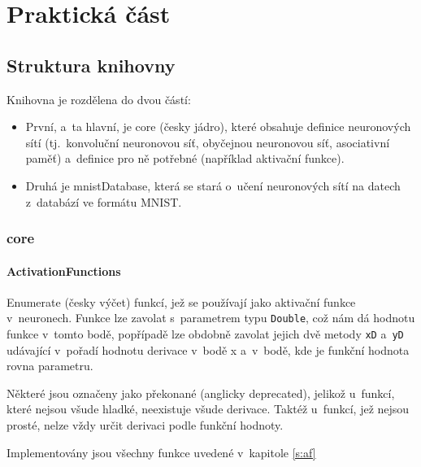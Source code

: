 \documentclass[12pt]{report}			%
\begin{document}
			
		
	\part{Praktická část}
	
		\chapter{Struktura knihovny}
			Knihovna je rozdělena do dvou částí:
			\begin{itemize}
				\item První, a~ta hlavní, je core (česky jádro), které obsahuje definice neuronových sítí (tj.~konvoluční neuronovou síť, obyčejnou neuronovou síť, asociativní paměť) a~definice pro ně potřebné (například aktivační funkce).
				\item Druhá je mnistDatabase, která se stará o~učení neuronových sítí na datech z~databází ve formátu MNIST.
			\end{itemize}
			
			\section{core}
			
				\subsection{ActivationFunctions}
					Enumerate (česky výčet) funkcí, jež se používají jako aktivační funkce v~neuronech. Funkce lze zavolat s~parametrem typu \verb!Double!, což nám dá hodnotu funkce v~tomto bodě, popřípadě lze obdobně zavolat jejich dvě metody \verb!xD! a~\verb!yD! udávající v~pořadí hodnotu derivace v~bodě x a~v~bodě, kde je funkční hodnota rovna parametru.
					
					Některé jsou označeny jako překonané (anglicky deprecated), jelikož u~funkcí, které nejsou všude hladké, neexistuje všude derivace. Taktéž u~funkcí, jež nejsou prosté, nelze vždy určit derivaci podle funkční hodnoty.
					
					Implementovány jsou všechny funkce uvedené v~kapitole \ref{s:af}
			
\end{document}
